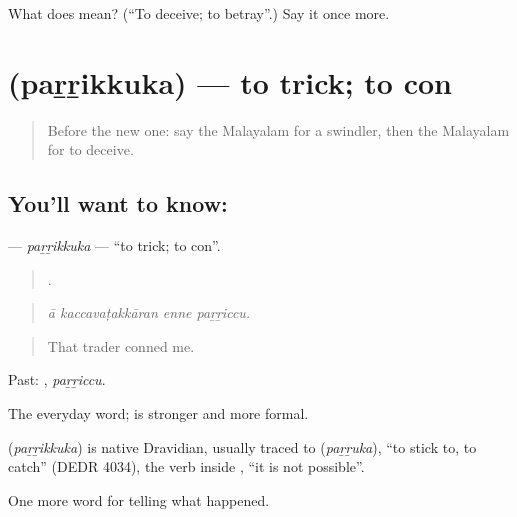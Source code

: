 \begin{tcolorbox}[breakable,colback=teal!4,colframe=teal!35!black,title={Before you move on}]
What does  mean? (\textquotedblleft{}To deceive; to betray\textquotedblright{}.) Say it once more.
\end{tcolorbox}
\section[\texorpdfstring{\ml{പറ്റിക്കുക} (paṟṟikkuka)}{പറ്റിക്കുക (paṟṟikkuka)}]{ (paṟṟikkuka) — to trick; to con}

\label{lesson:ML-C372-parrikkuka}



\begin{quote}
Before the new one: say the Malayalam for a swindler, then the Malayalam for to deceive.
\end{quote}

\subsection*{You'll want to know: }
\textbf{} — \emph{paṟṟikkuka} — \textquotedblleft{}to trick; to con\textquotedblright{}.

\begin{quote}
   .
\end{quote}

\begin{quote}
\emph{ā kaccavaṭakkāran enne paṟṟiccu.}
\end{quote}

\begin{quote}
That trader conned me.
\end{quote}

Past: , \emph{paṟṟiccu}.

The everyday word;  is stronger and more formal.

\begin{cousinweb}
\textbf{} (\emph{paṟṟikkuka}) is native Dravidian, usually traced to  (\emph{paṟṟuka}), \textquotedblleft{}to stick to, to catch\textquotedblright{} (DEDR 4034), the verb inside , \textquotedblleft{}it is not possible\textquotedblright{}.
\end{cousinweb}

\begin{grammarlens}[title={What you've built}]
One more word for telling what happened.
\end{grammarlens}

